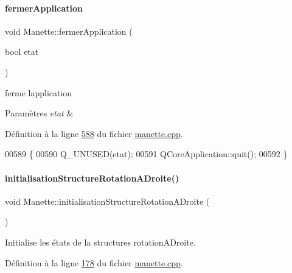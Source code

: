 \paragraph{\texorpdfstring{fermer\+Application}{fermerApplication}}
{\footnotesize\ttfamily void Manette\+::fermer\+Application (\begin{DoxyParamCaption}\item[{bool}]{etat }\end{DoxyParamCaption})\hspace{0.3cm}{\ttfamily [slot]}}



ferme l\textquotesingle{}application 


\begin{DoxyParams}{Paramètres}
{\em etat} & \\
\hline
\end{DoxyParams}


Définition à la ligne \hyperlink{manette_8cpp_source_l00588}{588} du fichier \hyperlink{manette_8cpp_source}{manette.\+cpp}.


\begin{DoxyCode}
00589 \{
00590     Q\_UNUSED(etat);
00591     QCoreApplication::quit();
00592 \}
\end{DoxyCode}
\mbox{\label{class_manette_a34e37141425dd6d62bcb5954312705c9}} 
\paragraph{\texorpdfstring{initialisation\+Structure\+Rotation\+A\+Droite()}{initialisationStructureRotationADroite()}}
{\footnotesize\ttfamily void Manette\+::initialisation\+Structure\+Rotation\+A\+Droite (\begin{DoxyParamCaption}{ }\end{DoxyParamCaption})\hspace{0.3cm}{\ttfamily [private]}}



Initialise les états de la structures rotation\+A\+Droite. 



Définition à la ligne \hyperlink{manette_8cpp_source_l00178}{178} du fichier \hyperlink{manette_8cpp_source}{manette.\+cpp}.



